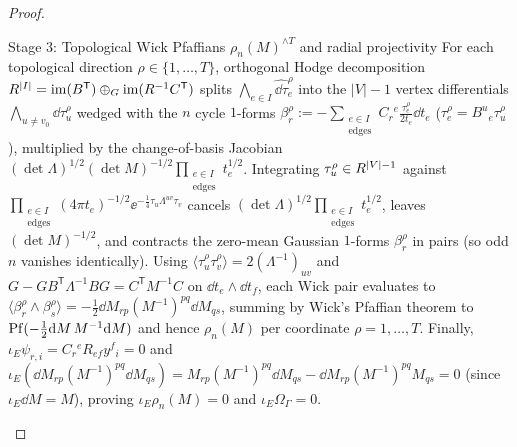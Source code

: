 \begin{proof}
\begin{proofpart}{Stage 3: Topological Wick Pfaffians $\rho_n(M)^{\wedge T}$ and radial projectivity}
For each topological direction $\rho \in \{1,\dots,T\}$, orthogonal Hodge decomposition $R^{|I|} = \operatorname{im}(B^{\mathsf{T}})\oplus_G \operatorname{im}(R^{-1}C^{\mathsf{T}})$ splits $\bigwedge_{e\in I}\widehat{\dd\tau}_e^\rho$ into the $|V|-1$ vertex differentials $\bigwedge_{u\neq v_0}\dd\tau_u^\rho$ wedged with the $n$ cycle $1$-forms $\beta_r^\rho := -\sum_{\substack{e\in I\\\mathrm{edges}}}C_r{}^e\frac{\tau_e^\rho}{2t_e}\dd t_e$ ($\tau_e^\rho = B^u{}_e\tau_u^\rho$), multiplied by the change-of-basis Jacobian $(\det\Lambda)^{1/2}(\det M)^{-1/2}\prod_{\substack{e\in I\\\mathrm{edges}}}t_e^{1/2}$. Integrating $\tau_u^\rho \in R^{|V|-1}$ against $\prod_{\substack{e\in I\\\mathrm{edges}}}(4\pi t_e)^{-1/2}\ee^{-\frac{1}{4}\tau_u\Lambda^{uv}\tau_v}$ cancels $(\det\Lambda)^{1/2}\prod_{\substack{e\in I\\\mathrm{edges}}}t_e^{1/2}$, leaves $(\det M)^{-1/2}$, and contracts the zero-mean Gaussian $1$-forms $\beta_r^\rho$ in pairs (so odd $n$ vanishes identically). Using $\langle\tau_u^\rho\tau_v^\rho\rangle = 2(\Lambda^{-1})_{uv}$ and $G - G B^{\mathsf{T}}\Lambda^{-1}B G = C^{\mathsf{T}}M^{-1}C$ on $\dd t_e\wedge\dd t_f$, each Wick pair evaluates to $\langle\beta_r^\rho\wedge\beta_s^\rho\rangle = -\frac{1}{2}\dd M_{rp}(M^{-1})^{pq}\dd M_{qs}$, summing by Wick's Pfaffian theorem to $\operatorname{Pf}(-\frac{1}{2}\mathrm{d} M\,M^{-1}\mathrm{d} M)$ and hence $\rho_n(M)$ per coordinate $\rho = 1,\dots,T$. Finally, $\iota_E\psi_{r,i} = C_r{}^e R_{ef}y^f{}_i = 0$ and $\iota_E(\dd M_{rp}(M^{-1})^{pq}\dd M_{qs}) = M_{rp}(M^{-1})^{pq}\dd M_{qs} - \dd M_{rp}(M^{-1})^{pq}M_{qs} = 0$ (since $\iota_E\dd M = M$), proving $\iota_E\rho_n(M) = 0$ and $\iota_E\Omega_\Gamma = 0$.
\end{proofpart}
\end{proof}
